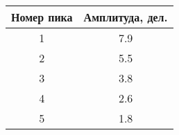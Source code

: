 \begin{tabular}{|c|c|}
\hline
Номер пика & Амплитуда, дел. \\ \hline
1 & 7.9 \\ \hline
2 & 5.5 \\ \hline
3 & 3.8 \\ \hline
4 & 2.6 \\ \hline
5 & 1.8 \\ \hline
\end{tabular}
